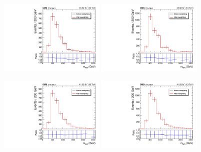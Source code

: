 \begin{figure}[htbp]
  \centering

  \includegraphics[width=0.45\textwidth]{figures/2016/Resolved_SR_Electron_WRCand_Mass.pdf}
  \hspace{0.01\textwidth}
  \includegraphics[width=0.45\textwidth]{figures/2016/Resolved_SR_Muon_WRCand_Mass.pdf}
  \vspace{0.01\textwidth}

  \includegraphics[width=0.45\textwidth]{figures/2017/Resolved_SR_Electron_WRCand_Mass.pdf}
  \hspace{0.01\textwidth}
  \includegraphics[width=0.45\textwidth]{figures/2017/Resolved_SR_Muon_WRCand_Mass.pdf}
  \vspace{0.01\textwidth}


\end{figure}
